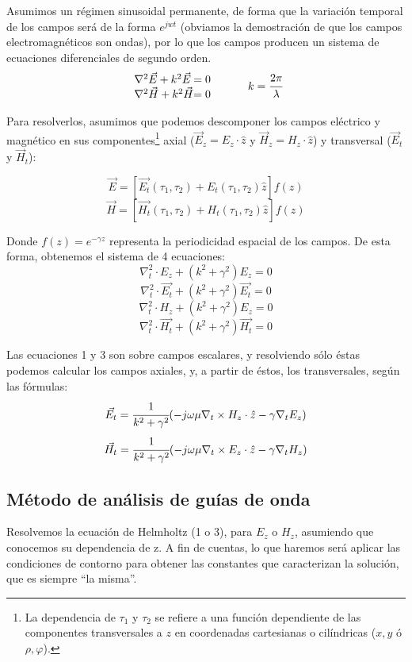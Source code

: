\documentclass[12pt]{article}
\begin{document}
Asumimos un r\'egimen sinusoidal permanente, de forma que la variaci\'on temporal de los campos ser\'a de la forma $e^{jwt}$ (obviamos la demostraci\'on de que los campos electromagn\'eticos son ondas), por lo que los campos producen un sistema de ecuaciones diferenciales de segundo orden.
$$
\begin{array}{l@{}l}
	\nabla^2\vec{E} + k^2\vec{E} &= 0 \\
	\nabla^2\vec{H} + k^2\vec{H} &= 0
\end{array}
\hspace{1cm}
k = \cfrac{2\pi}{\lambda}
$$

Para resolverlos, asumimos que podemos descomponer los campos el\'ectrico y magn\'etico en sus componentes\footnote{La dependencia de $\tau_1$ y $\tau_2$ se refiere a una funci\'on dependiente de las componentes transversales a $z$ en coordenadas cartesianas o cil\'indricas ($x,y$ \'o $\rho, \varphi$).} axial ($\vec{E}_z = E_z \cdot \hat{z}$ y $\vec{H}_z = H_z \cdot \hat{z}$) y transversal ($ \vec{E}_t$ y $ \vec{H}_t $):

$$\vec{E} = [\vec{E_t}(\tau_1, \tau_2) + E_t(\tau_1, \tau_2)\hat{z}]f(z)$$
$$\vec{H} = [\vec{H_t}(\tau_1, \tau_2) + H_t(\tau_1, \tau_2)\hat{z}]f(z)$$

Donde $f(z) = e^{-\gamma z}$ representa la periodicidad espacial de los campos. De esta forma, obtenemos el sistema de 4 ecuaciones:
$$\nabla^2 _t \cdot E_z + (k^2 + \gamma^2)E_z = 0$$
$$\nabla^2 _t \cdot \vec{E_t} + (k^2 + \gamma^2)\vec{E_t} = 0$$
$$\nabla^2 _t \cdot H_z + (k^2 + \gamma^2)E_z = 0$$
$$\nabla^2 _t \cdot \vec{H_t} + (k^2 + \gamma^2)\vec{H_t} = 0$$

Las ecuaciones 1 y 3 son sobre campos escalares, y resolviendo s\'olo \'estas podemos calcular los campos axiales, y,  a partir de \'estos, los transversales, seg\'un las f\'ormulas:
$$\vec{E_t}= \cfrac{1}{k^2 + \gamma^2}(-j\omega\mu\nabla_t \times H_z \cdot \hat{z} -\gamma \nabla_t E_z)$$
$$\vec{H_t}= \cfrac{1}{k^2 + \gamma^2}(-j\omega\mu\nabla_t \times E_z \cdot \hat{z} -\gamma \nabla_t H_z)$$


\subsection{M\'etodo de an\'alisis de gu\'ias de onda}

Resolvemos la ecuaci\'on de Helmholtz (1 o 3), para $E_z$ o $H_z$, asumiendo que conocemos su dependencia de z.
A fin de cuentas, lo que haremos ser\'a aplicar las condiciones de contorno para obtener las constantes que caracterizan la soluci\'on, que es siempre ``la misma''.
\end{document}
